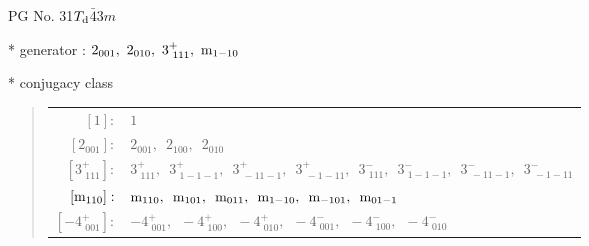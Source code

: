 \documentclass[fleqn,8pt]{jsarticle}
\begin{document}
\setcounter{MaxMatrixCols}{32}

\renewcommand{\tablename}{Table~}
\renewcommand{\figurename}{Figure~}
\begin{center}
\LARGE
PG No. 31\quad$T_{\rm d}$\quad$\bar{4}3m$\quad[ cubic ]
\end{center}

* generator : $2{}_{001},\,\,2{}_{010},\,\,3^{+}_{\,\,111},\,\,{\rm m}_{1-10}$

* conjugacy class
\begin{quote}
\begin{tabular}{rl}
$ [1]: $ & $ 1 $ \\
$ [2{}_{001}]: $ & $ 2{}_{001},\,\,\,2{}_{100},\,\,\,2{}_{010} $ \\
$ [3^{+}_{\,\,111}]: $ & $ 3^{+}_{\,\,111},\,\,\,3^{+}_{\,\,1-1-1},\,\,\,3^{+}_{\,\,-11-1},\,\,\,3^{+}_{\,\,-1-11},\,\,\,3^{-}_{\,\,111},\,\,\,3^{-}_{\,\,1-1-1},\,\,\,3^{-}_{\,\,-11-1},\,\,\,3^{-}_{\,\,-1-11} $ \\
$ [{\rm m}_{110}]: $ & $ {\rm m}_{110},\,\,\,{\rm m}_{101},\,\,\,{\rm m}_{011},\,\,\,{\rm m}_{1-10},\,\,\,{\rm m}_{-101},\,\,\,{\rm m}_{01-1} $ \\
$ [-4^{+}_{\,\,001}]: $ & $ -4^{+}_{\,\,001},\,\,\,-4^{+}_{\,\,100},\,\,\,-4^{+}_{\,\,010},\,\,\,-4^{-}_{\,\,001},\,\,\,-4^{-}_{\,\,100},\,\,\,-4^{-}_{\,\,010} $
\end{tabular}
\end{quote}
\end{document}
